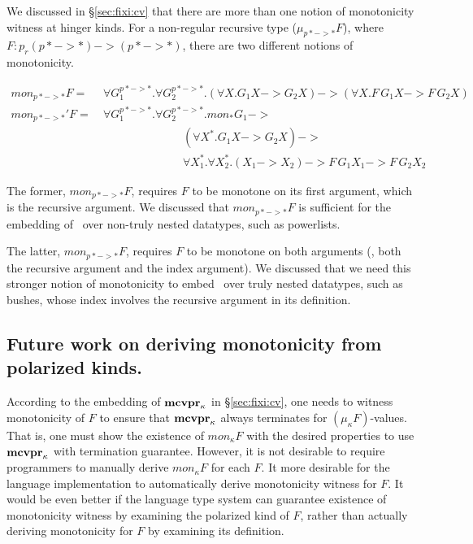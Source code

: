 We discussed in \S\ref{sec:fixi:cv} that there are more than one notion of
monotonicity witness at hinger kinds. For a non-regular recursive type
($\mu_{p* -> *} F$), where $F : p_r(p* -> *) -> (p* -> *)$, there are
two different notions of monotonicity.\vspace*{-1.5em}
\begin{singlespace}
\begin{align*}
\textit{mon}_{p* -> *}F =~&
	\forall G_1^{p* -> *}.\forall G_2^{p* -> *}.
	(\forall X. G_1 X -> G_2 X) -> (\forall X.F\,G_1 X -> F\,G_2 X)
	\\[1mm]
\textit{mon}_{p* -> *}'F =~&
	\forall G_1^{p* -> *}.\forall G_2^{p* -> *}.
		mon_{*} G_1 -> \\ & \qquad\qquad\qquad\quad
		(\forall X^{*}. G_1 X -> G_2 X) -> \\ & \qquad\qquad\qquad\quad
		\forall X_1^{*}.\forall X_2^{*}.
		(X_1 -> X_2) -> F\,G_1 X_1 -> F\,G_2 X_2
\end{align*}
\end{singlespace}
The former, $\textit{mon}_{p* -> *}F$, requires $F$ to be monotone
on its first argument, which is the recursive argument.
We discussed that $\textit{mon}_{p* -> *}F$ is sufficient
for the embedding of \McvPr\ over non-truly nested datatypes,
such as powerlists.

The latter, $\textit{mon}_{p* -> *}F$, requires $F$ to be monotone
on both arguments (\ie, both the recursive argument and the index argument).
We discussed that we need this stronger notion of monotonicity
to embed \McvPr\ over truly nested datatypes, such as bushes,
whose index involves the recursive argument in its definition.

\subsection*{Future work on deriving monotonicity from polarized kinds.}
According to the embedding of $\mathbf{mcvpr}_\kappa$ in \S\ref{sec:fixi:cv},
one needs to witness monotonicity of $F$ to ensure that $\mathbf{mcvpr}_\kappa$
always terminates for $(\mu_\kappa F)$-values. That is, one must show
the existence of $mon_{\kappa}F$ with the desired properties to use
$\mathbf{mcvpr}_\kappa$ with termination guarantee. However, it is not desirable
to require programmers to manually derive $mon_{\kappa}F$ for each $F$.
It more desirable for the language implementation to automatically
derive monotonicity witness for $F$. It would be even better if
the language type system can guarantee existence of monotonicity witness
by examining the polarized kind of $F$, rather than actually deriving
monotonicity for $F$ by examining its definition.

